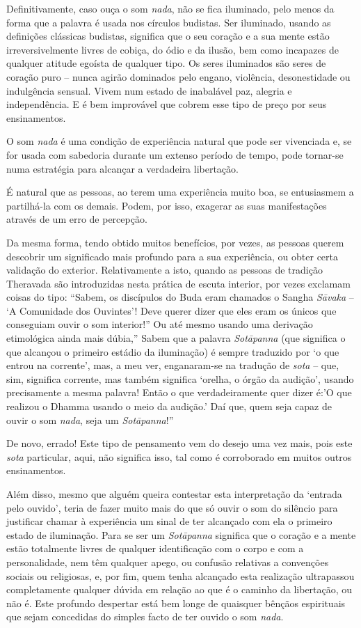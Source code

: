 Definitivamente, caso ouça o som \emph{nada}, não se fica iluminado,
pelo menos da forma que a palavra é usada nos círculos budistas. Ser
iluminado, usando as definições clássicas budistas, significa que o seu
coração e a sua mente estão irreversivelmente livres de cobiça, do ódio
e da ilusão, bem como incapazes de qualquer atitude egoísta de qualquer
tipo. Os seres iluminados são seres de coração puro -- nunca agirão
dominados pelo engano, violência, desonestidade ou indulgência sensual.
Vivem num estado de inabalável paz, alegria e independência. E é bem
improvável que cobrem esse tipo de preço por seus ensinamentos.

O som \emph{nada} é uma condição de experiência natural que pode ser
vivenciada e, se for usada com sabedoria durante um extenso período de
tempo, pode tornar-se numa estratégia para alcançar a verdadeira
libertação.

É natural que as pessoas, ao terem uma experiência muito boa, se
entusiasmem a partilhá-la com os demais. Podem, por isso, exagerar as
suas manifestações através de um erro de percepção.

Da mesma forma, tendo obtido muitos benefícios, por vezes, as pessoas
querem descobrir um significado mais profundo para a sua experiência, ou
obter certa validação do exterior. Relativamente a isto, quando as
pessoas de tradição Theravada são introduzidas nesta prática de escuta
interior, por vezes exclamam coisas do tipo: ``Sabem, os discípulos do
Buda eram chamados o Sangha \emph{Sāvaka} -- `A Comunidade dos
Ouvintes'! Deve querer dizer que eles eram os únicos que conseguiam
ouvir o som interior!'' Ou até mesmo usando uma derivação etimológica
ainda mais dúbia,'' Sabem que a palavra \emph{Sotāpanna} (que significa
o que alcançou o primeiro estádio da iluminação) é sempre traduzido por
`o que entrou na corrente', mas, a meu ver, enganaram-se na tradução de
\emph{sota} -- que, sim, significa corrente, mas também significa
`orelha, o órgão da audição', usando precisamente a mesma palavra! Então
o que verdadeiramente quer dizer é:'O que realizou o Dhamma usando o
meio da audição.' Daí que, quem seja capaz de ouvir o som \emph{nada},
seja um \emph{Sotāpanna}!''

De novo, errado! Este tipo de pensamento vem do desejo uma vez mais,
pois este \emph{sota} particular, aqui, não significa isso, tal como é
corroborado em muitos outros ensinamentos.\cite{ensinamentos}

Além disso, mesmo que alguém queira contestar esta interpretação da
`entrada pelo ouvido', teria de fazer muito mais do que só ouvir o som
do silêncio para justificar chamar à experiência um sinal de ter
alcançado com ela o primeiro estado de iluminação. Para se ser um
\emph{Sotāpanna} significa que o coração e a mente estão totalmente
livres de qualquer identificação com o corpo e com a personalidade, nem
têm qualquer apego, ou confusão relativas a convenções sociais ou
religiosas, e, por fim, quem tenha alcançado esta realização ultrapassou
completamente qualquer dúvida em relação ao que é o caminho da
libertação, ou não é. Este profundo despertar está bem longe de
quaisquer bênçãos espirituais que sejam concedidas do simples facto de
ter ouvido o som \emph{nada}.

